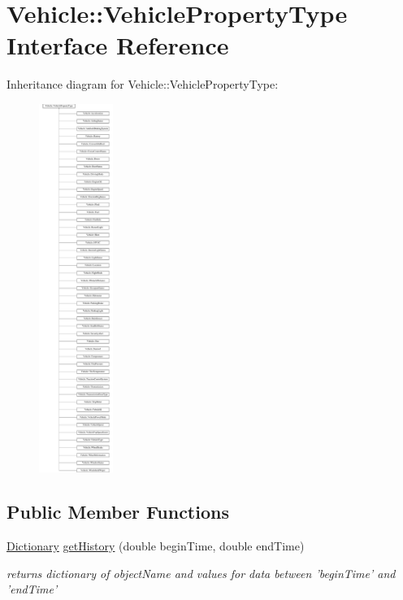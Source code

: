 \hypertarget{interfaceVehicle_1_1VehiclePropertyType}{\section{Vehicle\-:\-:Vehicle\-Property\-Type Interface Reference}
\label{interfaceVehicle_1_1VehiclePropertyType}
}
Inheritance diagram for Vehicle\-:\-:Vehicle\-Property\-Type\-:\begin{figure}[H]
\begin{center}
\leavevmode
\includegraphics[height=12.000000cm]{interfaceVehicle_1_1VehiclePropertyType}
\end{center}
\end{figure}
\subsection*{Public Member Functions}
\begin{DoxyCompactItemize}
\item 
\hyperlink{interfaceVehicle_1_1Dictionary}{Dictionary} \hyperlink{interfaceVehicle_1_1VehiclePropertyType_ae2107aff2961d91a0e86802a5710cea9}{get\-History} (double begin\-Time, double end\-Time)
\begin{DoxyCompactList}\small\item\em returns dictionary of object\-Name and values for data between 'begin\-Time' and 'end\-Time' \end{DoxyCompactList}\end{DoxyCompactItemize}

